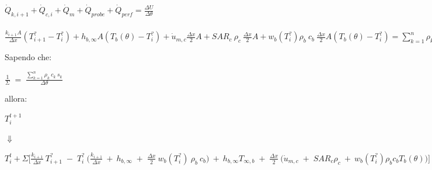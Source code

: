 \vspace{0.3cm}

\begin{center}
	$ \Dot{Q} _{k, i+1} +\Dot{Q} _{c, i}+ \Dot{Q} _{m} +\Dot{Q} _{probe}+ \Dot{Q} _{perf}= \frac{\Delta U}{\Delta \theta} $
\end{center}

\hspace{-0.5cm}
\begin{minipage}\columnwidth
\begin{center}
	$ \frac{k_{i+1}A}{\Delta x}(T_{i+1} ^? - T_i ^? ) + h_{b, \infty}A (T_{b} (\theta) - T_i ^? ) + \Dot{u} _{m,c}\frac{\Delta x}{2}A + SAR_{c} \: \rho _{c} \: \frac{\Delta x}{2}A  + w_b (T_i^?) \rho _b \: c_b \: \frac{\Delta x}{2}A(T_b(\theta)-T_i ^?) =  \sum_{k=1}^{n} \rho _{k} \: c_{k} \: s_{k} \: A \: \frac{(T_i ^{t+1} - T_i ^t )}{\Delta \theta}$
\end{center}
\end{minipage}




\vspace{0.5cm}
\noindent
\hspace{2cm} Sapendo che:
\vspace{-0.3cm}

\begin{center}
    $\frac{1}{\Sigma} \;=\; \frac{\sum_{k=1}^{n} \rho _{k} \: c_{k} \: s_{k}}{\Delta \theta}$
\end{center}



\vspace{0.3cm}
\noindent
\hspace{2cm} allora:
\vspace{-0.3cm}


\begin{center}
	$T_i ^{t+1}$
	\begin{center}
		\begin{center}
			$\Downarrow$
		\end{center}
	\end{center}
	$T_i ^t + \Sigma \Bigg[ \frac{k_{i+1}}{\Delta x}\: T_{i+1}^? \;-\; T_i^?\:\Big( \frac{k_{i+1}}{\Delta x} \:+\: h_{b,\infty} \;+\;  \frac{\Delta x}{2} \:  w_b (T_i^?) \: \rho _b \: c_b \Big) \:+\: h_{b, \infty} T_{\infty,b} \;+\; \frac{\Delta x}{2} \: \Big(\Dot{u}_{m,c} \;+\; SAR_{c} \rho_{c} \:+\:  w_b (T_i^?) \rho _b c_b T_b(\theta)\Big) \Bigg]$
\end{center}


\newpage

